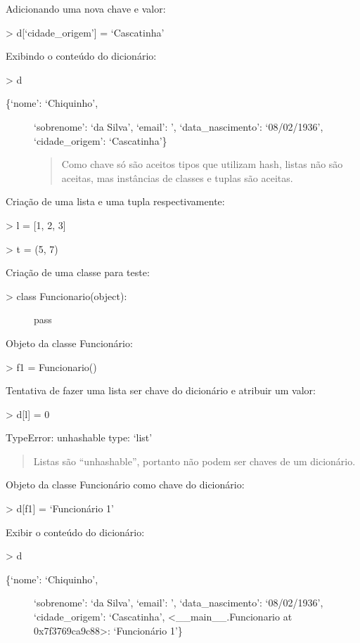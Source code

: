 \documentclass[letterpaper,10pt,brazil]{sphinxmanual}
\begin{document}
Adicionando uma nova chave e valor:

\textgreater{} d{[}‘cidade\_origem’{]} = ‘Cascatinha’

Exibindo o conteúdo do dicionário:

\textgreater{} d
\begin{description}
\item[{\{‘nome’: ‘Chiquinho’,}] \leavevmode
‘sobrenome’: ‘da Silva’,
‘email’: ’,
‘data\_nascimento’: ‘08/02/1936’,
‘cidade\_origem’: ‘Cascatinha’\}
\begin{quote}

Como chave só são aceitos tipos que utilizam hash, listas não são aceitas, mas instâncias de classes e tuplas são aceitas.
\end{quote}

\end{description}

Criação de uma lista e uma tupla respectivamente:

\textgreater{} l = {[}1, 2, 3{]}

\textgreater{} t = (5, 7)

Criação de uma classe para teste:
\begin{description}
\item[{\textgreater{} class Funcionario(object):}] \leavevmode
pass

\end{description}

Objeto da classe Funcionário:

\textgreater{} f1 = Funcionario()

Tentativa de fazer uma lista ser chave do dicionário e atribuir um valor:

\textgreater{} d{[}l{]} = 0

TypeError: unhashable type: ‘list’
\begin{quote}

Listas são “unhashable”, portanto não podem ser chaves de um dicionário.
\end{quote}

Objeto da classe Funcionário como chave do dicionário:

\textgreater{} d{[}f1{]} = ‘Funcionário 1’

Exibir o conteúdo do dicionário:

\textgreater{} d
\begin{description}
\item[{\{‘nome’: ‘Chiquinho’,}] \leavevmode
‘sobrenome’: ‘da Silva’,
‘email’: ’,
‘data\_nascimento’: ‘08/02/1936’,
‘cidade\_origem’: ‘Cascatinha’,
\textless{}\_\_main\_\_.Funcionario at 0x7f3769ca9c88\textgreater{}: ‘Funcionário 1’\}

\end{description}
\end{document}
